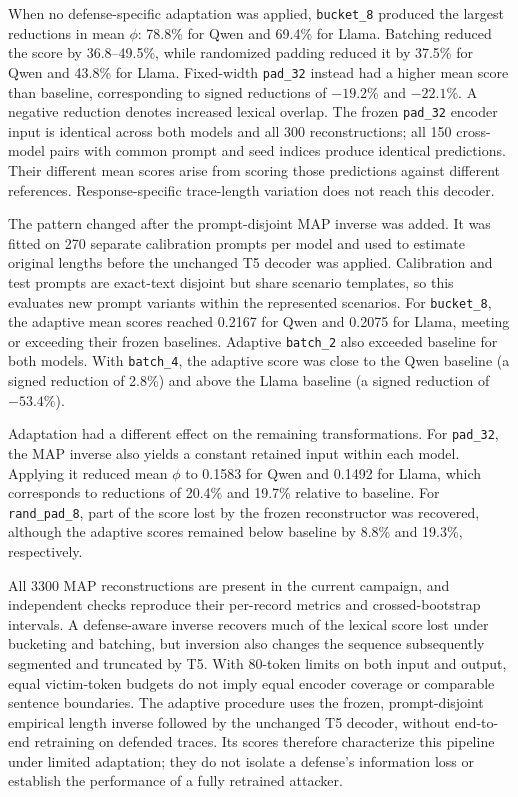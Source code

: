 \documentclass[electronics,article,submit,pdftex,moreauthors]{Definitions/mdpi}
\begin{document}
When no defense-specific adaptation was applied, \texttt{bucket\_8} produced the largest reductions in mean $\phi$: 78.8\% for Qwen and 69.4\% for Llama. Batching reduced the score by 36.8--49.5\%, while randomized padding reduced it by 37.5\% for Qwen and 43.8\% for Llama. Fixed-width \texttt{pad\_32} instead had a higher mean score than baseline, corresponding to signed reductions of $-19.2\%$ and $-22.1\%$. A negative reduction denotes increased lexical overlap. The frozen \texttt{pad\_32} encoder input is identical across both models and all 300 reconstructions; all 150 cross-model pairs with common prompt and seed indices produce identical predictions. Their different mean scores arise from scoring those predictions against different references. Response-specific trace-length variation does not reach this decoder.

The pattern changed after the prompt-disjoint MAP inverse was added. It was fitted on 270 separate calibration prompts per model and used to estimate original lengths before the unchanged T5 decoder was applied. Calibration and test prompts are exact-text disjoint but share scenario templates, so this evaluates new prompt variants within the represented scenarios. For \texttt{bucket\_8}, the adaptive mean scores reached 0.2167 for Qwen and 0.2075 for Llama, meeting or exceeding their frozen baselines. Adaptive \texttt{batch\_2} also exceeded baseline for both models. With \texttt{batch\_4}, the adaptive score was close to the Qwen baseline (a signed reduction of 2.8\%) and above the Llama baseline (a signed reduction of $-53.4\%$).

Adaptation had a different effect on the remaining transformations. For \texttt{pad\_32}, the MAP inverse also yields a constant retained input within each model. Applying it reduced mean $\phi$ to 0.1583 for Qwen and 0.1492 for Llama, which corresponds to reductions of 20.4\% and 19.7\% relative to baseline. For \texttt{rand\_pad\_8}, part of the score lost by the frozen reconstructor was recovered, although the adaptive scores remained below baseline by 8.8\% and 19.3\%, respectively.

All 3300 MAP reconstructions are present in the current campaign, and independent checks reproduce their per-record metrics and crossed-bootstrap intervals. A defense-aware inverse recovers much of the lexical score lost under bucketing and batching, but inversion also changes the sequence subsequently segmented and truncated by T5. With 80-token limits on both input and output, equal victim-token budgets do not imply equal encoder coverage or comparable sentence boundaries. The adaptive procedure uses the frozen, prompt-disjoint empirical length inverse followed by the unchanged T5 decoder, without end-to-end retraining on defended traces. Its scores therefore characterize this pipeline under limited adaptation; they do not isolate a defense's information loss or establish the performance of a fully retrained attacker.
\end{document}
